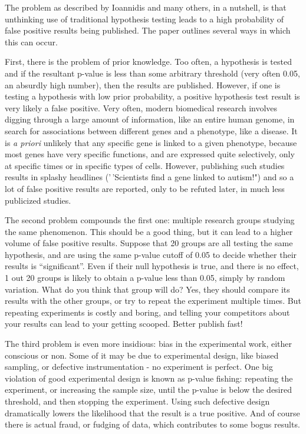 \documentclass[
]{book}
\theoremstyle{definition}
\theoremstyle{definition}
\theoremstyle{definition}
\theoremstyle{remark}
\begin{document}
The problem as described by Ioannidis and many others, in a nutshell, is that unthinking use of traditional hypothesis testing leads to a high probability of false positive results being published. The paper outlines several ways in which this can occur.

First, there is the problem of prior knowledge. Too often, a hypothesis is tested and if the resultant p-value is less than some arbitrary threshold (very often 0.05, an absurdly high number), then the results are published. However, if one is testing a hypothesis with low prior probability, a positive hypothesis test result is very likely a false positive. Very often, modern biomedical research involves digging through a large amount of information, like an entire human genome, in search for associations between different genes and a phenotype, like a disease. It is \emph{a priori} unlikely that any specific gene is linked to a given phenotype, because most genes have very specific functions, and are expressed quite selectively, only at specific times or in specific types of cells. However, publishing such studies results in splashy headlines ('\,'Scientists find a gene linked to autism!") and so a lot of false positive results are reported, only to be refuted later, in much less publicized studies.

The second problem compounds the first one: multiple research groups studying the same phenomenon. This should be a good thing, but it can lead to a higher volume of false positive results. Suppose that 20 groups are all testing the same hypothesis, and are using the same p-value cutoff of 0.05 to decide whether their results is ``significant''. Even if their null hypothesis is true, and there is no effect, 1 out 20 groups is likely to obtain a p-value less than 0.05, simply by random variation. What do you think that group will do? Yes, they should compare its results with the other groups, or try to repeat the experiment multiple times. But repeating experiments is costly and boring, and telling your competitors about your results can lead to your getting scooped. Better publish fast!

The third problem is even more insidious: bias in the experimental work, either conscious or non. Some of it may be due to experimental design, like biased sampling, or defective instrumentation - no experiment is perfect. One big violation of good experimental design is known as p-value fishing: repeating the experiment, or increasing the sample size, until the p-value is below the desired threshold, and then stopping the experiment. Using such defective design dramatically lowers the likelihood that the result is a true positive. And of course there is actual fraud, or fudging of data, which contributes to some bogus results.
\end{document}
